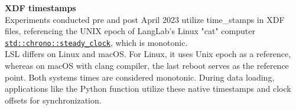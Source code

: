\begin{description}
\begin{addmargin}[0em]{0em}
\end{addmargin}
\medskip
\begin{addmargin}[0em]{0em}
    \item\textbf{XDF timestamps\\}
    Experiments conducted pre and post April 2023 utilize time\_stamps in XDF files, referencing the UNIX epoch of LangLab's Linux "cat" computer \href{https://en.cppreference.com/w/cpp/chrono/steady_clock}{\texttt{std::chrono::steady\_clock}}, which is monotonic.
    \\
    LSL differs on Linux and macOS. For Linux, it uses Unix epoch as a reference, whereas on macOS with clang compiler, the last reboot serves as the reference point. Both systems times are considered monotonic. During data loading, applications like the Python function  utilize these native timestamps and clock offsets for synchronization.
\end{addmargin}
    
\end{description}
